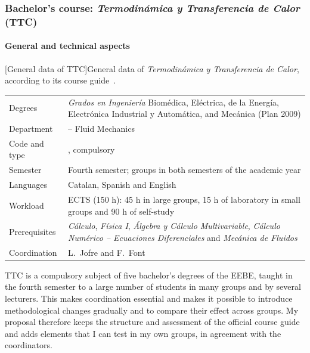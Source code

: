 \documentclass[11pt]{article}
\begin{document}
\subsubsection[Bachelor's course: \textit{Termodin\'amica y Transferencia de Calor} (TTC)]{Bachelor's course: \textit{Termodin\'amica y Transferencia de Calor} (TTC)}\label{sec:ttc}

\paragraph{General and technical aspects}

\begin{center}\small
{}[General data of TTC]{General data of \textit{Termodin\'amica y Transferencia de Calor}, according to its course guide~\cite{UPCGuides}.}\label{tab:ttc-data}
\begin{tabularx}{\textwidth}{@{}>{\leavevmode}p{3.2cm}>{\leavevmode}X@{}}
\toprule
 Degrees & \textit{Grados en Ingenier\'ia} Biom\'edica, El\'ectrica, de la Energ\'ia, Electr\'onica Industrial y Autom\'atica, and Mec\'anica (Plan 2009) \\
Department & 729 -- Fluid Mechanics \\
Code and type & 820020, compulsory \\
Semester & Fourth semester; groups in both semesters of the academic year \\
Languages & Catalan, Spanish and English \\
Workload & 6 ECTS (150 h): 45 h in large groups, 15 h of laboratory in small groups and 90 h of self-study \\
Prerequisites & \textit{C\'alculo}, \textit{F\'isica I}, \textit{\'Algebra y C\'alculo Multivariable}, \textit{C\'alculo Num\'erico -- Ecuaciones Diferenciales} and \textit{Mec\'anica de Fluidos} \\
Coordination & L.\ Jofre and F.\ Font \\
\bottomrule
\end{tabularx}
\end{center}

TTC is a compulsory subject of five bachelor's degrees of the EEBE, taught in the fourth semester to a large number of students in many groups and by several lecturers.
This makes coordination essential and makes it possible to introduce methodological changes gradually and to compare their effect across groups.
My proposal therefore keeps the structure and assessment of the official course guide and adds elements that I can test in my own groups, in agreement with the coordinators.
\end{document}
